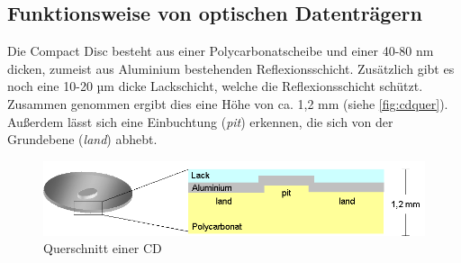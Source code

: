 \subsection{Funktionsweise von optischen Datenträgern}
\label{subsec:cdfunktionsweise}

Die Compact Disc besteht aus einer Polycarbonatscheibe und einer 40-80 nm
dicken, zumeist aus Aluminium bestehenden Reflexionsschicht. Zusätzlich gibt es
noch eine 10-20 µm dicke Lackschicht, welche die Reflexionsschicht schützt.
Zusammen genommen ergibt dies eine Höhe von ca. 1,2 mm (siehe
\autoref{fig:cdquer}). Außerdem lässt sich eine Einbuchtung (\textit{pit})
erkennen, die sich von der Grundebene (\textit{land}) abhebt. \cite{cfcd}

\begin{figure}[h]
    \begin{center}
        \begin{minipage}[t]{\textwidth}
            \begin{center}
                \includegraphics[height=0.1\textheight]{Bilder/Optische_Datentraeger_Die_Compact_Disc/Funktionsweise/cdquer.png}
                \caption[Querschnitt einer CD \newline \url{http://daten.didaktikchemie.uni-bayreuth.de/umat/cd_dvd/cd-ausschnitt.gif} (zuletzt aufgerufen am 07.08.2015)]{Querschnitt einer CD}
                \label{fig:cdquer}
            \end{center}
        \end{minipage}
    \end{center}
\end{figure}


